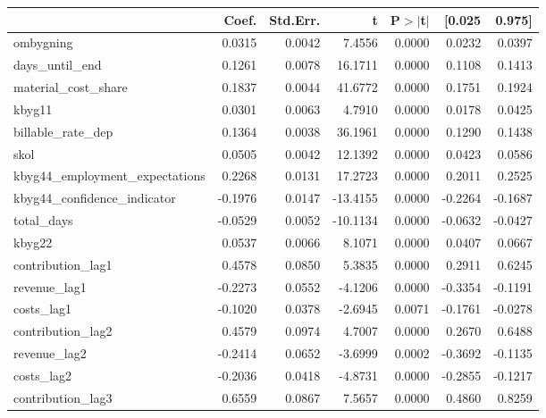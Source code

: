 \begin{table}
\begin{center}
\begin{tabular}{lrrrrrr}
\hline
                                   &   Coef. & Std.Err. &        t & P$> |$t$|$ &  [0.025 &  0.975]  \\
\hline
ombygning                          &  0.0315 &   0.0042 &   7.4556 &      0.0000 &  0.0232 &  0.0397  \\
days\_until\_end                   &  0.1261 &   0.0078 &  16.1711 &      0.0000 &  0.1108 &  0.1413  \\
material\_cost\_share              &  0.1837 &   0.0044 &  41.6772 &      0.0000 &  0.1751 &  0.1924  \\
kbyg11                             &  0.0301 &   0.0063 &   4.7910 &      0.0000 &  0.0178 &  0.0425  \\
billable\_rate\_dep                &  0.1364 &   0.0038 &  36.1961 &      0.0000 &  0.1290 &  0.1438  \\
skol                               &  0.0505 &   0.0042 &  12.1392 &      0.0000 &  0.0423 &  0.0586  \\
kbyg44\_employment\_expectations   &  0.2268 &   0.0131 &  17.2723 &      0.0000 &  0.2011 &  0.2525  \\
kbyg44\_confidence\_indicator      & -0.1976 &   0.0147 & -13.4155 &      0.0000 & -0.2264 & -0.1687  \\
total\_days                        & -0.0529 &   0.0052 & -10.1134 &      0.0000 & -0.0632 & -0.0427  \\
kbyg22                             &  0.0537 &   0.0066 &   8.1071 &      0.0000 &  0.0407 &  0.0667  \\
contribution\_lag1                 &  0.4578 &   0.0850 &   5.3835 &      0.0000 &  0.2911 &  0.6245  \\
revenue\_lag1                      & -0.2273 &   0.0552 &  -4.1206 &      0.0000 & -0.3354 & -0.1191  \\
costs\_lag1                        & -0.1020 &   0.0378 &  -2.6945 &      0.0071 & -0.1761 & -0.0278  \\
contribution\_lag2                 &  0.4579 &   0.0974 &   4.7007 &      0.0000 &  0.2670 &  0.6488  \\
revenue\_lag2                      & -0.2414 &   0.0652 &  -3.6999 &      0.0002 & -0.3692 & -0.1135  \\
costs\_lag2                        & -0.2036 &   0.0418 &  -4.8731 &      0.0000 & -0.2855 & -0.1217  \\
contribution\_lag3                 &  0.6559 &   0.0867 &   7.5657 &      0.0000 &  0.4860 &  0.8259  \\

\end{tabular}
\end{center}
\end{table}
